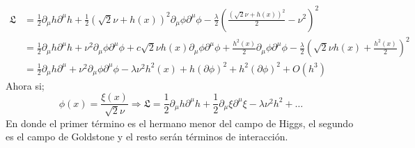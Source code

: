 \documentclass[../main.tex]{subfiles}
\begin{document}
 \begin{align*}
   \mathfrak{L} & = \frac{1}{2} \partial_\mu h \partial^\mu h + \frac{1}{2} \left( \sqrt{2}\nu + h(x) \right)^2 \partial_\mu \phi \partial^\mu \phi - \frac{\lambda}{2} \left( \frac{\left( \sqrt{2}\nu + h(x) \right)^2}{2} - \nu^2 \right)^2 \\
   & = \frac{1}{2} \partial_\mu h \partial^\mu h + \nu^2 \partial_\mu \phi\partial^\mu \phi +c\sqrt{2} \nu h(x) \partial_\mu \phi \partial^\mu \phi + \frac{h^2(x)}{2} \partial_\mu \phi \partial^\mu \phi - \frac{\lambda}{2} \left( \sqrt{2} \nu h(x) + \frac{h^2(x)}{2} \right)^2 \\
   & = \frac{1}{2} \partial_\mu h \partial^\mu + \nu^2 \partial_\mu \phi \partial^\mu \phi - \lambda \nu^2 h^2(x) + h(\partial\phi)^2 + h^2(\partial\phi)^2 + O(h^3)
 \end{align*}
 Ahora si;
 \begin{equation}
   \phi(x) = \frac{\xi(x)}{\sqrt{2}\nu} \Rightarrow \mathfrak{L} = \frac{1}{2} \partial_\mu h \partial^\mu h + \frac{1}{2} \partial_\mu \xi \partial^\mu \xi - \lambda \nu^2 h^2 + \dots
  \end{equation}
  En donde el primer término es el hermano menor del campo de Higgs, el segundo es el campo de Goldstone y el resto serán términos de interacción.
\end{document}
